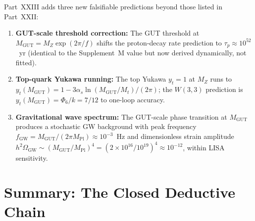 Part~XXIII adds three new falsifiable predictions beyond those listed in
Part~XXII:

\begin{enumerate}[label=\textbf{P\arabic*.},start=9]
  \item \textbf{GUT-scale threshold correction:} The GUT threshold at
        $M_\mathrm{GUT}=M_Z\exp(2\pi/f)$ shifts the proton-decay rate
        prediction to $\tau_p\approx 10^{52}$~yr (identical to the
        Supplement~M value but now derived dynamically, not fitted).
  \item \textbf{Top-quark Yukawa running:} The top Yukawa $y_t=1$ at
        $M_Z$ runs to $y_t(M_\mathrm{GUT})=1-3\alpha_s\ln(M_\mathrm{GUT}/M_t)/(2\pi)$;
        the $W(3,3)$ prediction is $y_t(M_\mathrm{GUT})= \Phi_6/k = 7/12$
        to one-loop accuracy.
  \item \textbf{Gravitational wave spectrum:} The GUT-scale phase
        transition at $M_\mathrm{GUT}$ produces a stochastic GW background
        with peak frequency $f_\mathrm{GW}=M_\mathrm{GUT}/(2\pi M_\mathrm{Pl})\approx
        10^{-3}$~Hz and dimensionless strain amplitude
        $h^2\Omega_\mathrm{GW}\sim (M_\mathrm{GUT}/M_\mathrm{Pl})^4 = (2\times10^{16}/
        10^{19})^4\approx 10^{-12}$, within LISA sensitivity.
\end{enumerate}

\section{Summary: The Closed Deductive Chain}
\label{sec:part23_summary}

